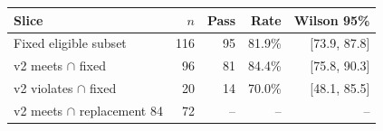 \begin{tabular}{lrrrr}
\toprule
\textbf{Slice} & \textbf{$n$} & \textbf{Pass} & \textbf{Rate} & \textbf{Wilson 95\%} \\
\midrule
Fixed eligible subset & 116 & 95 & 81.9\% & [73.9, 87.8] \\
v2 meets $\cap$ fixed & 96 & 81 & 84.4\% & [75.8, 90.3] \\
v2 violates $\cap$ fixed & 20 & 14 & 70.0\% & [48.1, 85.5] \\
v2 meets $\cap$ replacement 84 & 72 & -- & -- & -- \\
\bottomrule
\end{tabular}
